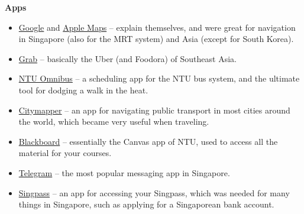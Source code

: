 \newpage
\textbf{Apps}
\begin{itemize}
    \item \href{https://www.google.com/url?sa=t&source=web&rct=j&opi=89978449&url=https://apps.apple.com/us/app/google-maps/id585027354&ved=2ahUKEwisooaR7ImOAxUtUlUIHSIjJoMQFnoECAoQAQ&usg=AOvVaw2jT7BmzU1GP-evpK9978cA}{Google} and \href{https://www.google.com/url?sa=t&source=web&rct=j&opi=89978449&url=https://apps.apple.com/us/app/apple-maps/id915056765&ved=2ahUKEwj04Nye7ImOAxU9FBAIHfmWCpgQFnoECAoQAQ&usg=AOvVaw2pPxeLW9EBDN3QYaTVb-FJ}{Apple Maps} -- explain themselves, and were great for navigation in Singapore (also for the MRT system) and Asia (except for South Korea).
    \item \href{https://www.google.com/url?sa=t&source=web&rct=j&opi=89978449&url=https://apps.apple.com/sg/app/grab-taxi-ride-food-delivery/id647268330&ved=2ahUKEwjF8Z-HwM6NAxX3U1UIHRNmCeEQFnoECAsQAQ&usg=AOvVaw0dB-Vqdf1YjwezvtAhQq6H}{Grab} -- basically the Uber (and Foodora) of Southeast Asia.
    \item \href{https://www.google.com/url?sa=t&source=web&rct=j&opi=89978449&url=https://apps.apple.com/us/app/ntu-omnibus/id1636457987&ved=2ahUKEwiV0aGN46-KAxWHIxAIHXUHBg0QFnoECBsQAQ&usg=AOvVaw0nbsveDMT3B2KE9kmpcAZ_}{NTU Omnibus} -- a scheduling app for the NTU bus system, and the ultimate tool for dodging a walk in the heat.
    \item \href{https://citymapper.com/ios?cmpage=slash&cmlink=topnav&region_id=dk-copenhagen}{Citymapper} -- an app for navigating public transport in most cities around the world, which became very useful when traveling.
    \item \href{https://www.google.com/url?sa=t&source=web&rct=j&opi=89978449&url=https://apps.apple.com/sg/app/blackboard/id950424861&ved=2ahUKEwjR5Mj_w4GLAxUSyTgGHSk2PeEQFnoECBAQAQ&usg=AOvVaw2T7qh926fpN6z3PnP8uqkT}{Blackboard} -- essentially the Canvas app of NTU, used to access all the material for your courses.
    \item \href{https://www.google.com/url?sa=t&source=web&rct=j&opi=89978449&url=https://apps.apple.com/us/app/telegram-messenger/id686449807&ved=2ahUKEwj0ksCUyc2LAxWazDgGHTttEz0QFnoECBYQAQ&usg=AOvVaw3whV8-0yYMcln1v7fxge7f}{Telegram} -- the most popular messaging app in Singapore.
    \item \href{https://www.google.com/url?sa=t&source=web&rct=j&opi=89978449&url=https://apps.apple.com/se/app/singpass/id1340660807&ved=2ahUKEwjU8fyHwc6NAxXaIxAIHctlNPIQFnoECB8QAQ&usg=AOvVaw3KrYhfL9kT4bAqZRZ4TscT}{Singpass} -- an app for accessing your Singpass, which was needed for many things in Singapore, such as applying for a Singaporean bank account.

\end{itemize}
